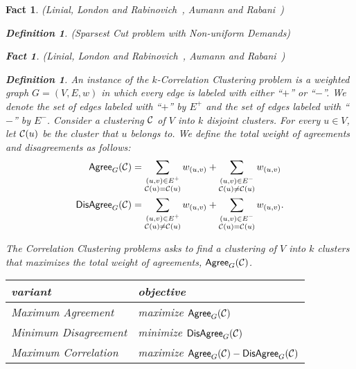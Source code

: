 \documentclass[twoside,leqno,twocolumn]{article}
\newtheorem{Definition}[theorem]{Definition}
\newtheorem{fact}[theorem]{Fact}
\begin{document}
\begin{fact}{\sc (Linial, London and Rabinovich~\cite{LLR}, Aumann and Rabani~\cite{AR})}
\begin{Definition} {\sc (Sparsest Cut problem with Non-uniform Demands)}
\begin{fact}{\sc (Linial, London and Rabinovich~\cite{LLR}, Aumann and Rabani~\cite{AR})}
\begin{Definition}
An instance of the $k$-Correlation Clustering problem is a weighted graph $G = (V,E,w)$ in which every edge 
is labeled with either ``$+$'' or ``$-$''. We denote the set of edges labeled with  ``$+$'' by $E^+$
and the set of edges labeled with ``$-$'' by $E^-$.
Consider a clustering $\cal C$ of $V$ into $k$ disjoint clusters. For every $u \in V$, let ${\cal C}(u)$ be the cluster that $u$ belongs to.
We define the total weight of agreements and disagreements as follows:
\begin{align*}
\mathsf{Agree}_G({\cal C}) &= \sum_{\substack{(u,v)\in E^+\\ {\cal C}(u) = {\cal C}(u)}} w_{(u,v)} + \sum_{\substack{(u,v)\in E^-\\ {\cal C}(u) \neq {\cal C}(u)}} w_{(u,v)}\\
\mathsf{DisAgree}_G({\cal C}) &= \sum_{\substack{(u,v)\in E^+\\ {\cal C}(u) \neq {\cal C}(u)}} w_{(u,v)} + \sum_{\substack{(u,v)\in E^-\\ {\cal C}(u) = {\cal C}(u)}} w_{(u,v)}.
\end{align*}

The Correlation Clustering problems asks to find a clustering of $V$ into $k$ clusters that maximizes the total weight of agreements, $\mathsf{Agree}_G({\cal C})$.
\end{Definition}

\begin{table*}
\centering
\begin{tabular}{|l|l|}
\hline \textbf{variant}     & \textbf{objective}\\ \hline
Maximum Agreement    & maximize  $\mathsf{Agree}_G({\cal C})$\\
Minimum Disagreement & minimize $\mathsf{DisAgree}_G({\cal C})$\\
Maximum Correlation  & maximize $\mathsf{Agree}_G({\cal C}) - \mathsf{DisAgree}_G({\cal C})$\\ \hline
\end{tabular}
\caption{The table shows different versions of the Correlation Clustering problem studied in the literature.}
\label{table:corrclust}
\end{table*}


\end{fact}
\end{Definition}
\end{fact}
\end{document}
